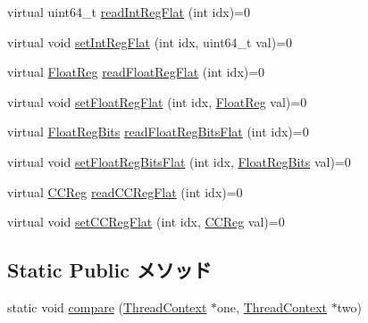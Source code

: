 \begin{Indent}{\bf }\par
{\em \label{_amgrpd41d8cd98f00b204e9800998ecf8427e}
 }\begin{DoxyCompactItemize}
\item 
virtual uint64\_\-t \hyperlink{classThreadContext_aebc14d23082a9095e0f641a6c5c8b083}{readIntRegFlat} (int idx)=0
\item 
virtual void \hyperlink{classThreadContext_a017c099cd6087484b0eb1892809b0572}{setIntRegFlat} (int idx, uint64\_\-t val)=0
\item 
virtual \hyperlink{classThreadContext_a75484259f1855aabc8d74c6eb1cfe186}{FloatReg} \hyperlink{classThreadContext_a275e2481d9069a0ae8142fb7cc901cbf}{readFloatRegFlat} (int idx)=0
\item 
virtual void \hyperlink{classThreadContext_a01392cdc362f9d589f90e57bcc519623}{setFloatRegFlat} (int idx, \hyperlink{classThreadContext_a75484259f1855aabc8d74c6eb1cfe186}{FloatReg} val)=0
\item 
virtual \hyperlink{classThreadContext_aab5eeae86499f9bfe15ef79360eccc64}{FloatRegBits} \hyperlink{classThreadContext_a3715f0deff5e4aeb64a8cf3ca293068b}{readFloatRegBitsFlat} (int idx)=0
\item 
virtual void \hyperlink{classThreadContext_a2964ca7e974bf80017ee30d832b32a35}{setFloatRegBitsFlat} (int idx, \hyperlink{classThreadContext_aab5eeae86499f9bfe15ef79360eccc64}{FloatRegBits} val)=0
\item 
virtual \hyperlink{classThreadContext_a0c9de550a32808e6a25b54b6c791d5ab}{CCReg} \hyperlink{classThreadContext_aa6d1af2db95563430c5ce31b38838a93}{readCCRegFlat} (int idx)=0
\item 
virtual void \hyperlink{classThreadContext_ab1028831649236bd6f229a4561663fd9}{setCCRegFlat} (int idx, \hyperlink{classThreadContext_a0c9de550a32808e6a25b54b6c791d5ab}{CCReg} val)=0
\end{DoxyCompactItemize}
\end{Indent}
\subsection*{Static Public メソッド}
\begin{DoxyCompactItemize}
\item 
static void \hyperlink{classThreadContext_a504f3701af193f6d1c7f59d43696fca6}{compare} (\hyperlink{classThreadContext}{ThreadContext} $\ast$one, \hyperlink{classThreadContext}{ThreadContext} $\ast$two)
\end{DoxyCompactItemize}
